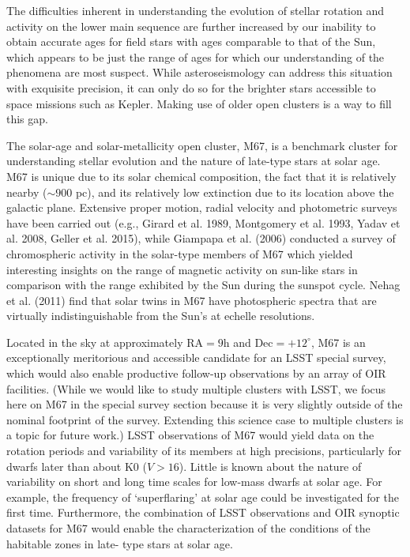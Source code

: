 The difficulties inherent in understanding the evolution of stellar
rotation and activity on the lower main sequence are further increased
by our inability to obtain accurate ages for field stars with ages
comparable to that of the Sun, which appears to be just the range
of ages for which our understanding of the phenomena are most suspect.
While asteroseismology can address this situation with exquisite precision,
it can only do so for the brighter stars accessible to space missions
such as Kepler. Making use of older open clusters is a way to fill
this gap.

The solar-age and solar-metallicity open cluster, M67, is a benchmark
cluster for understanding stellar evolution and the nature of late-type
stars at solar age. M67 is unique due to its solar chemical composition,
the fact that it is relatively nearby ($\sim900$ pc), and its relatively
low extinction due to its location above the galactic plane. Extensive
proper motion, radial velocity and photometric surveys have been carried
out (e.g., Girard et al. 1989, Montgomery et al. 1993, Yadav et al.
2008, Geller et al. 2015), while Giampapa et al. (2006) conducted
a survey of chromospheric activity in the solar-type members of M67
which yielded interesting insights on the range of magnetic activity
on sun-like stars in comparison with the range exhibited by the Sun
during the sunspot cycle. Nehag et al. (2011) find that solar twins
in M67 have photospheric spectra that are virtually indistinguishable
from the Sun\textquoteright{}s at echelle resolutions.

Located in the sky at approximately $\mathrm{RA}=9\mathrm{h}$ and
$\mathrm{Dec}=+12^{\circ}$, M67 is an exceptionally meritorious and
accessible candidate for an LSST special survey, which would also enable
productive follow-up observations by an array of OIR facilities.
(While we would like to study multiple clusters with LSST, we focus here on M67 in the special survey section because it is very slightly outside of the nominal footprint of the survey. Extending this science case to multiple clusters is a topic for future work.) LSST
observations of M67 would yield data on the rotation periods and variability
of its members at high precisions, particularly for dwarfs later than
about K0 ($V>16$). Little is known about the nature of variability
on short and long time scales for low-mass dwarfs at solar age. For
example, the frequency of \textquoteleft{}superflaring\textquoteright{}
at solar age could be investigated for the first time. Furthermore,
the combination of LSST observations and OIR synoptic datasets for
M67 would enable the characterization of the conditions of the habitable
zones in late- type stars at solar age.

